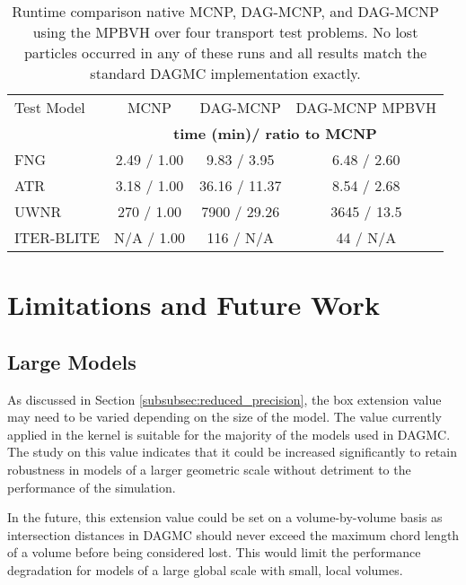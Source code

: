\begin{table}[H]
  \small
  \begin{center}
    \begin{tabular}{lccc}

      \toprule
      Test Model & MCNP & DAG-MCNP & DAG-MCNP MPBVH \\
      & \multicolumn{3}{c}{\textbf{time (min)/ ratio to MCNP}} \\
      \hline
      FNG           & 2.49 / 1.00 &  9.83  / 3.95  & 6.48 / 2.60 \\
      ATR           & 3.18 / 1.00 &  36.16 / 11.37 & 8.54 / 2.68 \\
      UWNR          & 270  / 1.00 &  7900  / 29.26 & 3645 / 13.5 \\
      ITER-BLITE    & N/A  / 1.00 &  116   / N/A   & 44   / N/A  \\
      \bottomrule
    \end{tabular}
  \end{center}
  \caption{Runtime comparison native MCNP, DAG-MCNP, and DAG-MCNP using the
    MPBVH over four transport test problems. No lost particles occurred in any of
  these runs and all results match the standard DAGMC implementation exactly.}
  \label{tab:mpbvh_transport_timing_production}
\end{table}

\section{Limitations and Future Work}


\subsection{Large Models}

As discussed in Section \ref{subsubsec:reduced_precision}, the box extension
value may need to be varied depending on the size of the model. The value
currently applied in the kernel is suitable for the majority of the models used
in DAGMC. The study on this value indicates that it could be increased
significantly to retain robustness in models of a larger geometric scale without
detriment to the performance of the simulation.

In the future, this extension value could be set on a volume-by-volume basis as
intersection distances in DAGMC should never exceed the maximum chord length of
a volume before being considered lost. This would limit the performance
degradation for models of a large global scale with small, local volumes.

